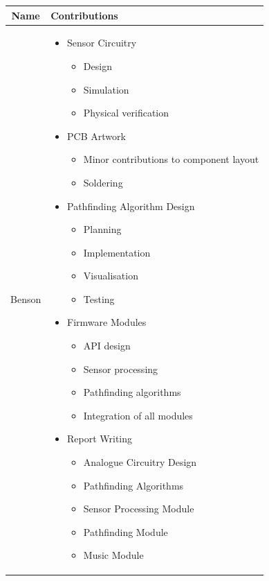 \documentclass[conference]{IEEEtran}
\begin{document}
\begin{tabularx}{\linewidth}{ | c | X | }
	\hline
	Name   & Contributions                     \\
	\hline
	Benson & \begin{itemize}
		         \item Sensor Circuitry
		               \begin{itemize}
			      \item Design
			      \item Simulation
			      \item Physical verification
		      \end{itemize}
		         \item PCB Artwork
		               \begin{itemize}
			      \item Minor contributions to component layout
			      \item Soldering
		      \end{itemize}
		         \item Pathfinding Algorithm Design
		               \begin{itemize}
			      \item Planning
			      \item Implementation
			      \item Visualisation
			      \item Testing
		      \end{itemize}
		         \item Firmware Modules
		               \begin{itemize}
			      \item API design
			      \item Sensor processing
			      \item Pathfinding algorithms
			      \item Integration of all modules
		      \end{itemize}
		         \item Report Writing
		               \begin{itemize}
			      \item Analogue Circuitry Design
			      \item Pathfinding Algorithms
			      \item Sensor Processing Module
			      \item Pathfinding Module
			      \item Music Module
		      \end{itemize}
	         \end{itemize} \\
	\hline


\end{tabularx}
\end{document}
